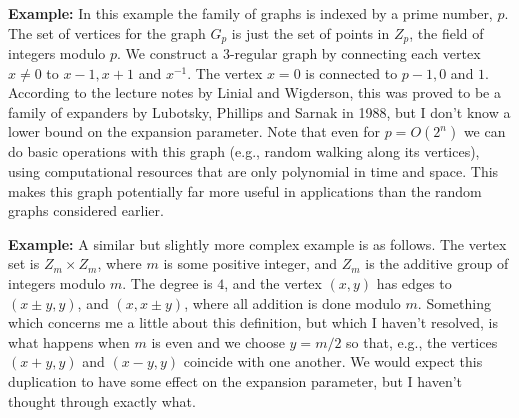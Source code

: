 \documentclass[12pt]{article}
\begin{document}
\textbf{Example:} In this example the family of graphs is indexed by a
prime number, $p$.  The set of vertices for the graph $G_p$ is just
the set of points in $Z_p$, the field of integers modulo $p$.  We
construct a $3$-regular graph by connecting each vertex $x \neq 0$ to
$x-1,x+1$ and $x^{-1}$.  The vertex $x=0$ is connected to $p-1,0$ and
$1$.  According to the lecture notes by Linial and Wigderson, this was
proved to be a family of expanders by Lubotsky, Phillips and Sarnak in
1988, but I don't know a lower bound on the expansion parameter.  Note
that even for $p = O(2^n)$ we can do basic operations with this graph
(e.g., random walking along its vertices), using computational
resources that are only polynomial in time and space.  This makes this
graph potentially far more useful in applications than the random
graphs considered earlier.

\textbf{Example:} A similar but slightly more complex example is as
follows.  The vertex set is $Z_m \times Z_m$, where $m$ is some
positive integer, and $Z_m$ is the additive group of integers modulo
$m$.  The degree is $4$, and the vertex $(x,y)$ has edges to $(x\pm
y,y)$, and $(x,x \pm y)$, where all addition is done modulo $m$.
Something which concerns me a little about this definition, but which
I haven't resolved, is what happens when $m$ is even and we choose $y
= m/2$ so that, e.g., the vertices $(x+y,y)$ and $(x-y,y)$ coincide
with one another.  We would expect this duplication to have some
effect on the expansion parameter, but I haven't thought through
exactly what.



\end{document}
